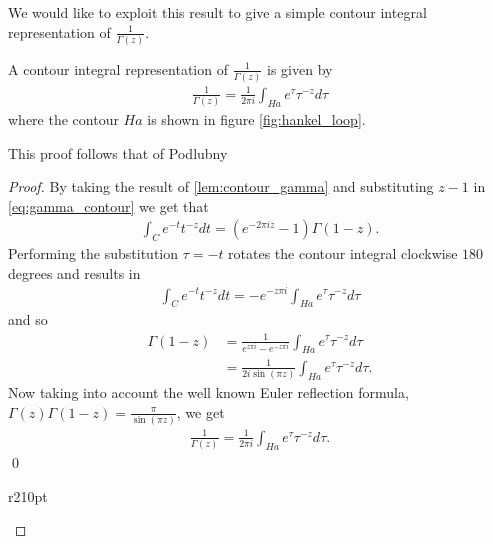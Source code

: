We would like to exploit this result to give a simple contour integral representation of $ \frac{1}{\Gamma(z)} $.
\begin{mdframed}[innertopmargin=10pt]
\begin{lemma}
    \label{lem:contour_1_gamma_1}
    A contour integral representation of $ \frac{1}{\Gamma(z)} $ is given by
    \begin{align*}
        \frac{1}{\Gamma(z)} = \frac{1}{2 \pi i} \int_{Ha} e^\tau \tau^{-z} d\tau
    \end{align*}
    where the contour $ Ha $ is shown in figure \ref{fig:hankel_loop}.
\end{lemma}
\end{mdframed}
This proof follows that of Podlubny \cite{Podlubny1999}
\begin{proof}
    By taking the result of \ref{lem:contour_gamma} and substituting $ z-1 $ in \eqref{eq:gamma_contour}
    we get that
    \begin{align*}
        \int_C e^{-t} t^{-z} dt = (e^{-2 \pi i z} -1) \Gamma(1-z).
    \end{align*}
    Performing the substitution $ \tau = -t $ rotates the contour integral clockwise $ 180 $ degrees 
    and results in 
    \begin{align*}
        \int_{C} e^{-t} t^{-z} dt = - e^{-z\pi i}\int_{Ha} e^{\tau} \tau^{-z} d\tau
    \end{align*}
    and so
    \begin{align*}
        \Gamma(1-z) &= \frac{1}{e^{z\pi i} - e^{-z \pi i}} \int_{Ha} e^\tau \tau^{-z} d\tau \\
            &= \frac{1}{2i \sin(\pi z)}\int_{Ha} e^\tau \tau^{-z} d\tau.
    \end{align*}
    Now taking into account the well known Euler reflection formula, $ \Gamma(z)\Gamma(1-z) = \frac{\pi}{\sin(\pi z)} $, we get
    \begin{align*}
        \frac{1}{\Gamma(z)} = \frac{1}{2 \pi i} \int_{Ha} e^\tau \tau^{-z} d\tau.
    \end{align*} \qed
    \begin{wrapfigure}{r}{210pt}
        
        \caption{The Hankel contour Ha}
        \label{fig:hankel_loop}
    \end{wrapfigure}
\end{proof}

